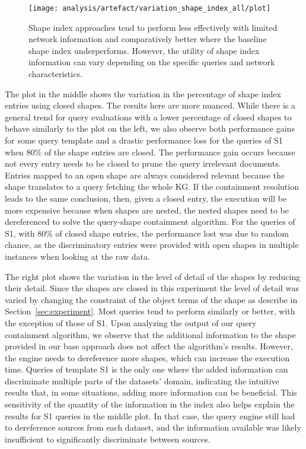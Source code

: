 \begin{figure}
    \centering
    \texttt{[image: analysis/artefact/variation\_shape\_index\_all/plot]}
    \caption{
    Shape index approaches tend to perform less effectively with limited network information and comparatively better where the baseline shape index underperforms.
    However, the utility of shape index information can vary depending on the specific queries and network characteristics.
    }
    \label{fig:adaptShapeIndex}
\end{figure}


The plot in the middle shows the variation in the percentage of shape index entries using closed shapes.
The results here are more nuanced.
While there is a general trend for query evaluations with a lower percentage of closed shapes to behave similarly to the plot on the left, we also observe both performance gains for some query template and a drastic performance loss for the queries of S1 when 80\% of the shape entries are closed.
The performance gain occurs because not every entry needs to be closed to prune the query irrelevant documents.
Entries mapped to an open shape are always considered relevant because the shape translates to a query fetching the whole KG.
If the containment resolution leads to the same conclusion, then, given a closed entry, the execution will be more expensive because 
when shapes are nested, the nested shapes need to be dereferenced to solve the query-shape containment algorithm.
For the queries of S1, with 80\% of closed shape entries, the performance lost was due to random chance, as the discriminatory entries were provided with open shapes in multiple instances when looking at the raw data.

The right plot shows the variation in the level of detail of the shapes by reducing their detail.
Since the shapes are closed in this experiment the level of detail was varied by changing the constraint of the object terms of the shape as describe in Section~\ref{sec:experiment}.
Most queries tend to perform similarly or better, with the exception of those of S1.
Upon analyzing the output of our query containment algorithm, we observe that the additional information to the shape provided in our base approach does not affect the algorithm’s results.
However, the engine needs to dereference more shapes, which can increase the execution time.
Queries of template S1 is the only one where the added information can discriminate multiple parts of the datasets' domain, indicating the intuitive results that, in some situations, adding more information can be beneficial.
This sensitivity of the quantity of the information in the index also helps explain the results for S1 queries in the middle plot. 
In that case, the query engine still had to dereference sources from each dataset, and the information available was likely insufficient to significantly discriminate between sources.

